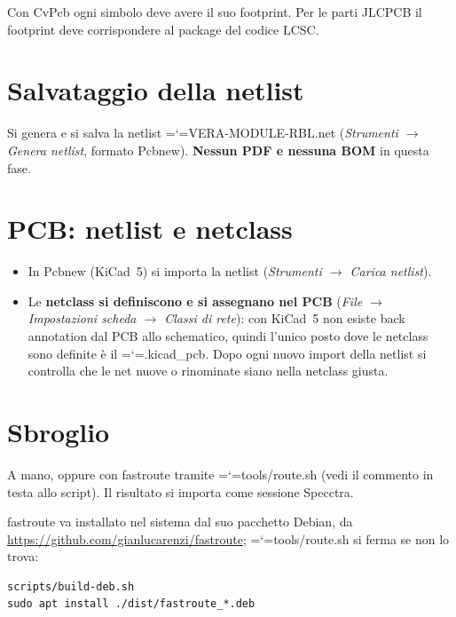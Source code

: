 \documentclass[11pt,a4paper]{article}
\makeatletter
\newcommand{\file}[1]{{\ttfamily\hyphenchar\font=`\-\relax\language=\l@nohyphenation #1}}
\makeatother
\begin{document}
Con CvPcb ogni simbolo deve avere il suo footprint. Per le parti JLCPCB il
footprint deve corrispondere al package del codice LCSC.

\section{Salvataggio della netlist}

Si genera e si salva la netlist \file{VERA-MODULE-RBL.net} (\emph{Strumenti
$\rightarrow$ Genera netlist}, formato Pcbnew). \textbf{Nessun PDF e nessuna
BOM} in questa fase.

\section{PCB: netlist e netclass}

\begin{itemize}[leftmargin=*]
  \item In Pcbnew (KiCad~5) si importa la netlist (\emph{Strumenti
        $\rightarrow$ Carica netlist}).
  \item Le \textbf{netclass si definiscono e si assegnano nel PCB}
        (\emph{File $\rightarrow$ Impostazioni scheda $\rightarrow$ Classi di
        rete}): con KiCad~5 non esiste back annotation dal PCB allo
        schematico, quindi l'unico posto dove le netclass sono definite è il
        \file{.kicad\_pcb}. Dopo ogni nuovo import della netlist si controlla
        che le net nuove o rinominate siano nella netclass giusta.
\end{itemize}

\section{Sbroglio}

A mano, oppure con fastroute tramite \file{tools/route.sh} (vedi il commento in
testa allo script). Il risultato si importa come sessione Specctra.

fastroute va installato nel sistema dal suo pacchetto Debian, da
\url{https://github.com/gianlucarenzi/fastroute}; \file{tools/route.sh} si ferma
se non lo trova:

\begin{lstlisting}[style=shell]
scripts/build-deb.sh
sudo apt install ./dist/fastroute_*.deb
\end{lstlisting}
\end{document}
